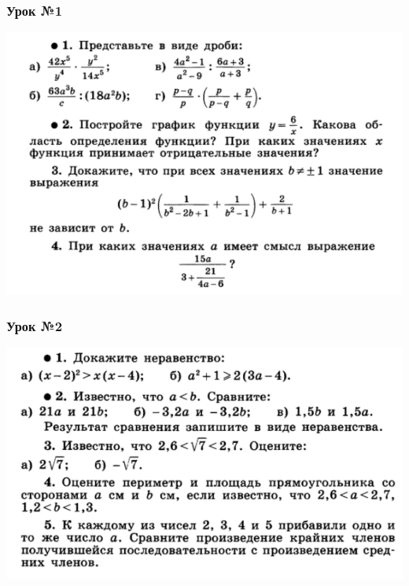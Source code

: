 \documentclass[algebra,a5paper]{pum}
\date{28.04.20}
\begin{document}
\subsubsection*{Урок №1}
\includegraphics[width=\textwidth]{img/16-1.png}

\subsubsection*{Урок №2}
\includegraphics[width=\textwidth]{img/16-2.png}
\end{document}
